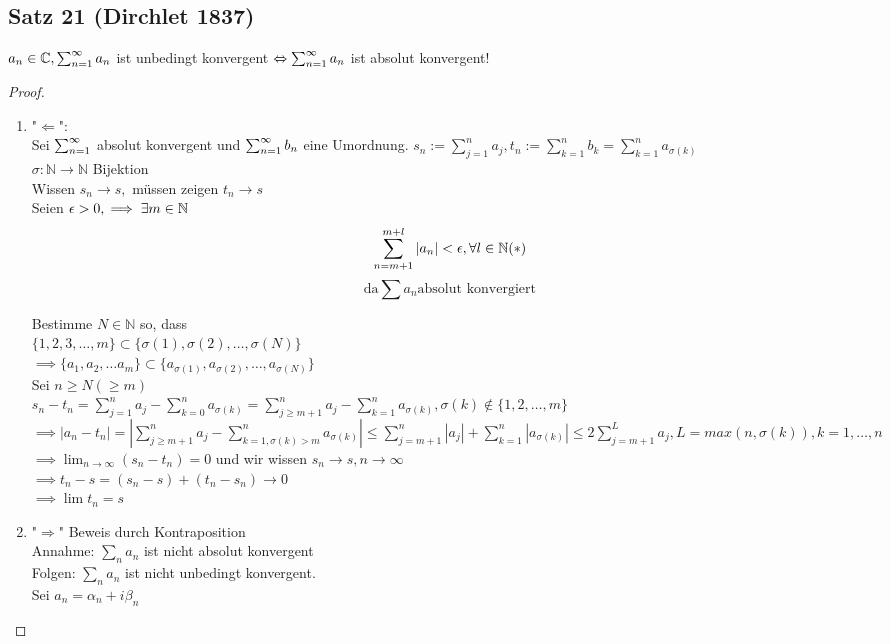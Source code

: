 \subsection{Satz 21 (Dirchlet 1837)}
$a_n \in\mathbb{C}, \sum_{n=1}^{\infty} a_n$ ist unbedingt konvergent $\Leftrightarrow \sum_{n=1}^{\infty} a_n$ ist absolut konvergent!\\
\begin{proof}
\begin{enumerate}[1)]
  \item "$\Leftarrow$": \\
  Sei $\sum_{n=1}^{\infty}$ absolut konvergent und $\sum_{n=1}^{\infty} b_n$ eine Umordnung.
  $s_n := \sum_{j=1}^n a_j, t_n := \sum_{k=1}^n b_k = \sum_{k=1}^n a_{\sigma (k)}$\\
  $\sigma : \mathbb{N} \rightarrow \mathbb{N}$ Bijektion\\
  Wissen $s_n \rightarrow s,$ müssen zeigen $t_n \rightarrow s$\\
  Seien $\epsilon > 0, \implies \exists m \in \mathbb{N}$
  $$\sum_{n=m+1}^{m+l} |a_n| < \epsilon, \forall l \in\mathbb{N}\text{(\textasteriskcentered )}$$
  $$\text{da} \sum a_n \text{absolut konvergiert}$$

  Bestimme $N \in \mathbb{N}$ so, dass\\
  $\{ 1,2,3,\ldots,m\} \subset \{ \sigma (1), \sigma (2), \ldots, \sigma (N)\}$\\
  $\implies \{a_1, a_2, \ldots a_m\} \subset \{a_{\sigma (1)}, a_{\sigma(2)}, \ldots , a_{\sigma (N)}\}$\\
  Sei $n\geq N (\geq m)$\\
  $s_n - t_n = \sum_{j=1}^n a_j - \sum_{k=0}^n a_{\sigma (k)} = \sum_{j \geq m + 1}^n a_j - \sum_{k=1}^n a_{\sigma (k)}, \sigma (k) \notin \{1,2,\ldots ,m\}$\\
  $\implies |a_n - t_n| = |\sum_{j\geq m + 1}^n a_j - \sum_{k=1, \sigma(k) > m}^n a_{\sigma (k)}| \leq \sum_{j=m+1}^n |a_j| + \sum_{k=1}^n |a_{\sigma (k)}| \leq 2 \sum_{j=m+1}^L a_j, L = max(n, \sigma (k)), k=1,\ldots ,n$\\
  $\implies \lim_{n\rightarrow\infty} (s_n - t_n) = 0$ und wir wissen $s_n \rightarrow s, n \rightarrow\infty$\\
  $\implies t_n - s = (s_n - s) + (t_n - s_n) \rightarrow 0$\\
  $\implies \lim t_n = s$ \checkmark
  \item "$\Rightarrow$" Beweis durch Kontraposition\\
  Annahme: $\sum_n a_n$ ist nicht absolut konvergent\\
  Folgen: $\sum_n a_n$ ist nicht unbedingt konvergent.\\
  Sei $a_n = \alpha_n + i \beta_n$
  

\end{enumerate}
\end{proof}
